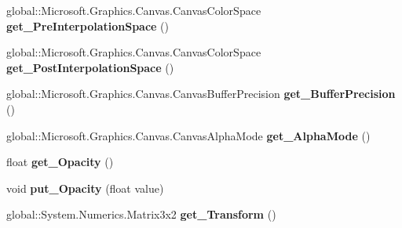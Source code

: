 \begin{DoxyCompactItemize}
global\+::\+Microsoft.\+Graphics.\+Canvas.\+Canvas\+Color\+Space {\bfseries get\+\_\+\+Pre\+Interpolation\+Space} ()
\item 
\mbox{\label{class_microsoft_1_1_graphics_1_1_canvas_1_1_brushes_1_1_canvas_radial_gradient_brush_a785455e32693ce5dfe7078cfda12ceb4}} 
global\+::\+Microsoft.\+Graphics.\+Canvas.\+Canvas\+Color\+Space {\bfseries get\+\_\+\+Post\+Interpolation\+Space} ()
\item 
\mbox{\label{class_microsoft_1_1_graphics_1_1_canvas_1_1_brushes_1_1_canvas_radial_gradient_brush_aafd2f6623623d25c32311c900cbd8290}} 
global\+::\+Microsoft.\+Graphics.\+Canvas.\+Canvas\+Buffer\+Precision {\bfseries get\+\_\+\+Buffer\+Precision} ()
\item 
\mbox{\label{class_microsoft_1_1_graphics_1_1_canvas_1_1_brushes_1_1_canvas_radial_gradient_brush_acc50a38d650db9d56c06e7ceccffd903}} 
global\+::\+Microsoft.\+Graphics.\+Canvas.\+Canvas\+Alpha\+Mode {\bfseries get\+\_\+\+Alpha\+Mode} ()
\item 
\mbox{\label{class_microsoft_1_1_graphics_1_1_canvas_1_1_brushes_1_1_canvas_radial_gradient_brush_acd71a294a1a4501f8a3a2b41d2e7af17}} 
float {\bfseries get\+\_\+\+Opacity} ()
\item 
\mbox{\label{class_microsoft_1_1_graphics_1_1_canvas_1_1_brushes_1_1_canvas_radial_gradient_brush_a16b901b253e0b85c05eeb242450257a6}} 
void {\bfseries put\+\_\+\+Opacity} (float value)
\item 
\mbox{\label{class_microsoft_1_1_graphics_1_1_canvas_1_1_brushes_1_1_canvas_radial_gradient_brush_a9289c0459527b50261ca3f4a0eff81ba}} 
global\+::\+System.\+Numerics.\+Matrix3x2 {\bfseries get\+\_\+\+Transform} ()
\item 
\mbox{\label{class_microsoft_1_1_graphics_1_1_canvas_1_1_brushes_1_1_canvas_radial_gradient_brush_a9e92247cac2dd0bfc5529b906645ed4d}} 

\end{DoxyCompactItemize}

